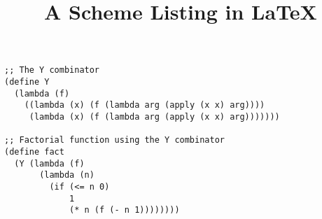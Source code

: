 \documentclass{article}
\begin{document}
\title{A Scheme Listing in \LaTeX}
\date{}
\maketitle

\begin{lstlisting}
;; The Y combinator
(define Y
  (lambda (f)
    ((lambda (x) (f (lambda arg (apply (x x) arg))))
     (lambda (x) (f (lambda arg (apply (x x) arg)))))))

;; Factorial function using the Y combinator
(define fact
  (Y (lambda (f)
       (lambda (n)
         (if (<= n 0)
             1
             (* n (f (- n 1))))))))     
\end{lstlisting}
\end{document}
